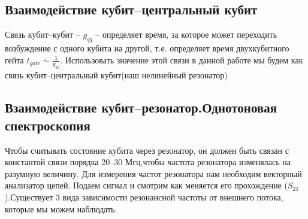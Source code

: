 \documentclass[12pt, twoside]{report}
\begin{document}
 		\subsection{Взаимодействие кубит--центральный кубит}
Связь кубит--кубит -- $g_{qq}$ -- определяет время, за которое может переходить возбуждение с одного кубита на другой, т.е. определяет время двухкубитного гейта\cite{Rigetti2010} $t_{gate}\sim \frac{1}{g_{qq}}$. Использовать значение этой связи в данной работе мы будем как связь кубит--центральный кубит(наш нелинейный резонатор) 
\newpage	
		\subsection{Взаимодействие кубит--резонатор.Однотоновая спектроскопия}
Чтобы считывать состояние кубита через резонатор, он должен быть связан с константой связи порядка 20--30 Мгц,чтобы частота резонатора изменялась на разумную величину. Для измерения частот резонатора нам необходим векторный анализатор цепей. Подаем сигнал и смотрим как меняется его прохождение ($S_{21}$).Существует 3 вида зависимости резонансной частоты от внешнего потока, которые мы можем наблюдать:
\end{document}
